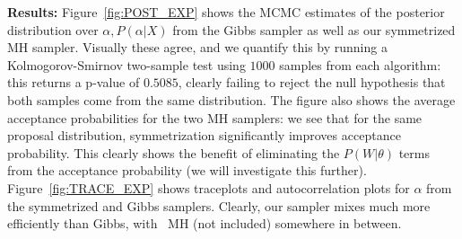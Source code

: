 \noindent \textbf{Results:}
Figure~\ref{fig:POST_EXP} shows the MCMC estimates of the posterior distribution over $\alpha, P(\alpha|X)$ from the Gibbs sampler as well as our symmetrized MH sampler. 
Visually these agree, and we quantify this by running a Kolmogorov-Smirnov two-sample test using $1000$ samples from each algorithm: this returns a p-value of $0.5085$, clearly failing to reject the null hypothesis that both samples come from the same distribution. 
The figure also shows the average acceptance probabilities for the two MH samplers: we see that for the same proposal distribution, symmetrization significantly improves acceptance probability. This clearly shows the benefit of eliminating the $P(W|\theta)$ terms from the acceptance probability (we will investigate this further). Figure~\ref{fig:TRACE_EXP} shows traceplots and autocorrelation plots for $\alpha$ from the symmetrized and Gibbs samplers. Clearly, our sampler mixes much more efficiently than Gibbs, with \naive\ MH (not included) somewhere in between.


